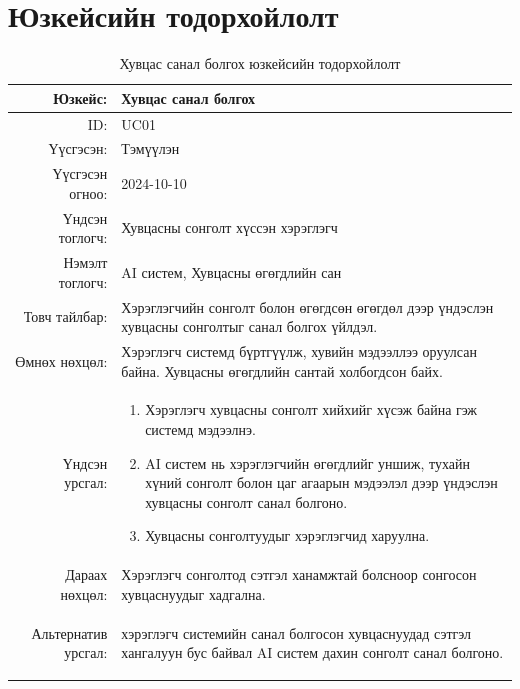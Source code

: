 \section{Юзкейсийн тодорхойлолт}
\begin{longtable}{|r|p{11.5cm}|}
    \caption{Хувцас санал болгох юзкейсийн тодорхойлолт} 
    \label{table:songolt1}\\ \hline
    {Юзкейс:} & {Хувцас санал болгох}\\ \hline
    {ID:} & {UC01}\\ \hline
    {Үүсгэсэн:} & {Тэмүүлэн}\\ \hline
    {Үүсгэсэн огноо:} & {2024-10-10}\\ \hline
    {Үндсэн тоглогч:} & {Хувцасны сонголт хүссэн хэрэглэгч}\\ \hline
    {Нэмэлт тоглогч:} & {AI систем, Хувцасны өгөгдлийн сан}\\ \hline
    {Товч тайлбар:} & {Хэрэглэгчийн сонголт болон өгөгдсөн өгөгдөл дээр үндэслэн хувцасны сонголтыг санал болгох үйлдэл.}\\ \hline
    {Өмнөх нөхцөл:} & {Хэрэглэгч системд бүртгүүлж, хувийн мэдээллээ оруулсан байна. Хувцасны өгөгдлийн сантай холбогдсон байх.}\\ \hline
    {Үндсэн урсгал:} & {\begin{enumerate}
        \item Хэрэглэгч хувцасны сонголт хийхийг хүсэж байна гэж системд мэдээлнэ.
    \item AI систем нь хэрэглэгчийн өгөгдлийг уншиж, тухайн хүний сонголт болон цаг агаарын мэдээлэл дээр үндэслэн хувцасны сонголт санал болгоно.
    \item Хувцасны сонголтуудыг хэрэглэгчид харуулна.\end{enumerate}}\\\hline
    {Дараах нөхцөл:} & {Хэрэглэгч сонголтод сэтгэл ханамжтай болсноор сонгосон хувцаснуудыг хадгална.}\\ \hline
    {Альтернатив урсгал:} & {\begin{enumerate}
         хэрэглэгч системийн санал болгосон хувцаснуудад сэтгэл хангалуун бус байвал AI систем дахин сонголт санал болгоно. 
    \end{enumerate} }\\ \hline
\end{longtable}
\newpage

